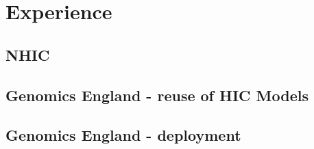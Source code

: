 \section{Experience}

\subsection{NHIC}

\subsection{Genomics England - reuse of HIC Models}

\subsection{Genomics England -  deployment}
